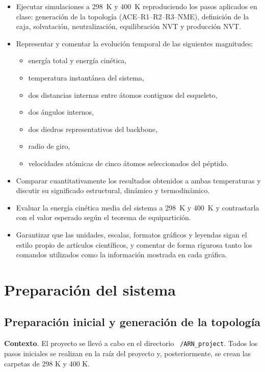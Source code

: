 \documentclass[12pt,a4paper]{article}
\begin{document}
\begin{itemize}
  \item Ejecutar simulaciones a \SI{298}{K} y \SI{400}{K} reproduciendo los pasos aplicados en clase: generación de la topología (ACE–R1–R2–R3–NME), definición de la caja, solvatación, neutralización, equilibración NVT y producción NVT.
  
  \item Representar y comentar la evolución temporal de las siguientes magnitudes:
    \begin{itemize}
      \item energía total y energía cinética,
      \item temperatura instantánea del sistema,
      \item dos distancias internas entre átomos contiguos del esqueleto,
      \item dos ángulos internos,
      \item dos diedros representativos del backbone,
      \item radio de giro,
      \item velocidades atómicas de cinco átomos seleccionados del péptido.
    \end{itemize}

  \item Comparar cuantitativamente los resultados obtenidos a ambas temperaturas y discutir su significado estructural, dinámico y termodinámico.

  \item Evaluar la energía cinética media del sistema a \SI{298}{K} y \SI{400}{K} y contrastarla con el valor esperado según el teorema de equipartición.

  \item Garantizar que las unidades, escalas, formatos gráficos y leyendas sigan el estilo propio de artículos científicos, y comentar de forma rigurosa tanto los comandos utilizados como la información mostrada en cada gráfica.

\end{itemize}


\section{Preparación del sistema}
\label{sec:metodologia}

\subsection{Preparación inicial y generación de la topología}
\textbf{Contexto}. El proyecto se llevó a cabo en el directorio \texttt{~/ARN\_project}. Todos los pasos iniciales se realizan en la raíz del proyecto y, posteriormente, se crean las carpetas de 298 K y 400 K.
\end{document}
